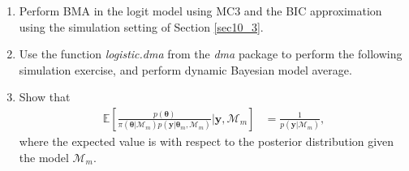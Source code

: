 \begin{enumerate}
\item Perform BMA in the logit model using MC3 and the BIC approximation using the simulation setting of Section \ref{sec10_3}.

\item Use the function \textit{logistic.dma} from the \textit{dma} package to perform the following simulation exercise, and perform dynamic Bayesian model average.

\item Show that 
\begin{align*}
	\mathbb{E}\left[\frac{p(\bm{\theta})}{\pi(\bm{\theta}|\mathcal{M}_m)p(\bm{y}|\bm{\theta}_m,\mathcal{M}_m)}\biggr\rvert \bm{y},\mathcal{M}_m\right]&=\frac{1}{p(\bm{y}|\mathcal{M}_m)},
\end{align*}
where the expected value is with respect to the posterior distribution given the model $\mathcal{M}_m$.        
	
\end{enumerate}